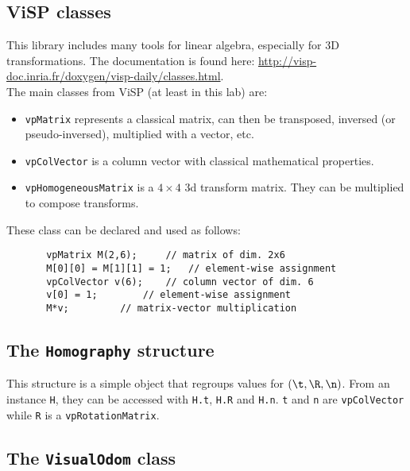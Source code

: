 \documentclass{ecnreport}
\begin{document}
\subsection{ViSP classes}

This library includes many tools for linear algebra, especially for 3D transformations. 
The documentation is found here: \url{http://visp-doc.inria.fr/doxygen/visp-daily/classes.html}.\\
The main classes from ViSP (at least in this lab) are:
\begin{itemize}
\item \texttt{vpMatrix} represents a classical matrix, can then be transposed, inversed (or pseudo-inversed), multiplied with a vector, etc.
\item \texttt{vpColVector} is a column vector with classical mathematical properties.
\item \texttt{vpHomogeneousMatrix} is a $4\times 4$ 3d transform matrix. They can be multiplied to compose transforms.
\end{itemize}
These class can be declared and used as follows:
\begin{center}\cppstyle
\begin{lstlisting}
       vpMatrix M(2,6); 	// matrix of dim. 2x6
       M[0][0] = M[1][1] = 1;	// element-wise assignment
       vpColVector v(6);	// column vector of dim. 6
       v[0] = 1;		// element-wise assignment
       M*v;			// matrix-vector multiplication
\end{lstlisting}
\end{center}

\subsection{The \texttt{Homography} structure}
\label{sec:homog}

This structure is a simple object that regroups values for $(\t,\R,\n)$. From an instance \texttt{H}, they can be accessed with \texttt{H.t}, 
\texttt{H.R} and \texttt{H.n}. \texttt{t} and \texttt{n} are \texttt{vpColVector} while \texttt{R} is a \texttt{vpRotationMatrix}.

\subsection{The \texttt{VisualOdom} class}
\end{document}
